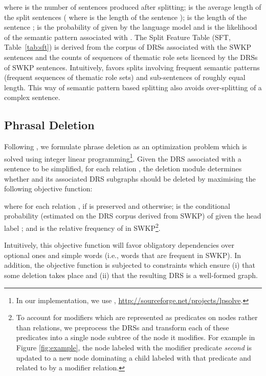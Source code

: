 \documentclass[11pt,a4paper]{article}
\newcommand{\nlang}[1]{{\it #1}}
\begin{document}
where  is the number of sentences produced after splitting;
 is the average length of the split sentences ( where  is the length of the sentence );
 is the length of the sentence ;  is the
probability of  given by the language model and  is
the likelihood of the semantic pattern associated with . The
Split Feature Table (SFT, Table~\ref{tab:sft}) is derived from the
corpus of DRSs associated with the SWKP sentences and the counts of
sequences of thematic role sets licenced by the DRSs of SWKP
sentences. Intuitively,  favors splits involving frequent
semantic patterns (frequent sequences of thematic role sets) and
sub-sentences of roughly equal length. This way of semantic pattern
based splitting also avoids over-splitting of a complex sentence.




\subsection{Phrasal Deletion}
\label{subsec:deletion}

Following , we formulate phrase
deletion as an optimization problem which is solved using integer
linear programming\footnote{In our implementation, we use ,
  \url{http://sourceforge.net/projects/lpsolve}. }. Given the DRS 
associated with a sentence to be simplified, for each relation , the deletion module determines whether  and its associated DRS
subgraphs should be deleted by maximising the following objective
function:

{
  \footnotesize
  \vspace{-0.15cm}
  
  \vspace{-0.25cm}
}

where for each relation ,  if  is preserved
and  otherwise;  is the conditional
probability (estimated on the DRS corpus derived from SWKP) of 
given the head label ; and  is the relative frequency of 
in SWKP\footnote{To account for modifiers which are represented as
  predicates on nodes rather than relations, we preprocess the DRSs
  and transform each of these predicates into a single node subtree of
  the node it modifies. For example in Figure \ref{fig:example},
  the node  labeled with the modifier predicate \nlang{second} is
  updated to a new node  dominating a child labeled with that
  predicate and related to  by a modifier relation.}.

Intuitively, this objective function will favor obligatory
dependencies over optional ones and simple words (i.e., words that are
frequent in SWKP). In addition, the objective function is subjected to
constraints which ensure (i) that some deletion takes place and (ii)
that the resulting DRS is a well-formed graph.
\end{document}
